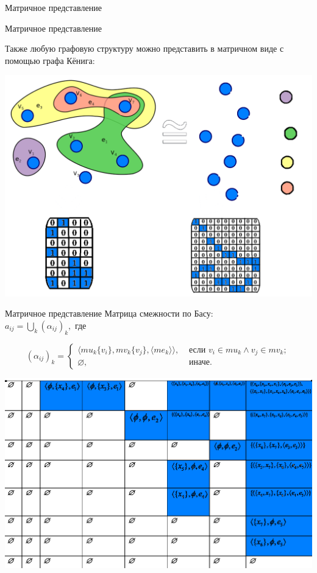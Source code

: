 \documentclass{beamer}
\begin{document}
\begin{darkframes}
\begin{frame}[label=simmonshall]{Матричное представление}
				
		\end{frame}

		\begin{frame}{Матричное представление}
		\centering

			Также \alert{любую графовую структуру} можно представить в матричном виде с помощью графа Кёнига:

			\includegraphics[scale=0.22]{resources/kenig}
		\end{frame}

		\begin{frame}{Матричное представление}
			\centering
			\alert{Матрица смежности по Басу:} \\$a_{ij}=\bigcup \limits_k(\alpha_{ij})_k, $
			где			\vspace*{-0.3cm}

			\begin{equation*}
			(\alpha_{ij})_k = 
			 \begin{cases}
			   \langle mu_k\{v_i\}, mv_k\{v_j\},\langle me_k \rangle \rangle, & \text{ если } v_i \in mu_k \wedge v_j \in mv_k ;\\
			   \varnothing, & \text{ иначе.}
			 \end{cases}
			\end{equation*} 
			\vspace*{-0.5cm}
			\centering
			
				\includegraphics[scale=0.23]{resources/basuadj}
		\end{frame}


\end{darkframes}
\end{document}
